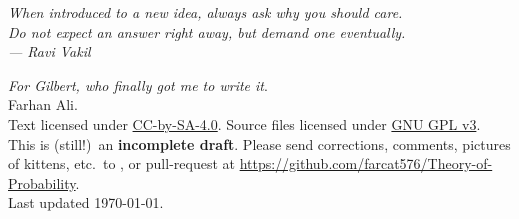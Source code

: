 \begin{titlepage}
	\vspace*{3cm}
	\begin{flushright}
		\large\itshape
		When introduced to a new idea, always ask why you should care. \\[0.2cm]
		Do not expect an answer right away, but demand one eventually. \\[0.8cm]
		--- Ravi Vakil \cite{ref:vakil}
	\end{flushright}

	\vspace*{8em}
	\hrulebar
	

	\vfill
	{
	\small
	\noindent \emph{For Gilbert, who finally got me to write it}. \\[0.4cm]
	\noindent {\copyright} \the\year{} Farhan Ali. \\
	Text licensed under
	\href{https://creativecommons.org/licenses/by-sa/4.0/}{CC-by-SA-4.0}.
	Source files licensed under
	\href{https://choosealicense.com/licenses/gpl-3.0/}{GNU GPL v3}.
	\\[0.4cm]
	This is (still!)\ an \textbf{incomplete draft}.
	Please send corrections, comments, pictures of kittens,
	etc.\ to ,
	or pull-request at \url{https://github.com/farcat576/Theory-of-Probability}.
	\\[0.4cm]
	\noindent Last updated \today.
	\vspace*{1cm}
	}
\end{titlepage}
